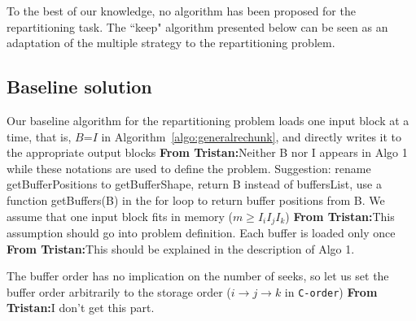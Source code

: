 \documentclass[conference]{IEEEtran}
\newcommand{\tristan}[1]{\color{orange}\textbf{From Tristan:}#1\color{black}}
\begin{document}
To the best of our knowledge, no algorithm has been proposed for the
repartitioning task. The ``keep" algorithm presented below can be seen as an
adaptation of the multiple strategy to the repartitioning problem.

\subsection{Baseline solution}

Our baseline algorithm for the repartitioning problem loads one input block
at a time, that is, $B$=$I$ in
Algorithm~\ref{algo:generalrechunk}, and directly writes it to the appropriate output blocks \tristan{Neither B nor I appears in Algo 1 while these notations are used to define the problem.
Suggestion: rename getBufferPositions to getBufferShape, return B instead of buffersList, use a function getBuffers(B) in the for loop to return buffer positions from B}.
We assume that one input block fits in memory ($m \geq I_iI_jI_k$) \tristan{This assumption should go into problem definition}. Each
buffer is loaded only once \tristan{This should be explained in the description of Algo 1.}

The buffer order has no
implication on the number of seeks, so let us set the buffer order arbitrarily
to the storage order ($i \rightarrow j \rightarrow k$ in \texttt{C-order}) \tristan{I don't get this part}.
\end{document}
